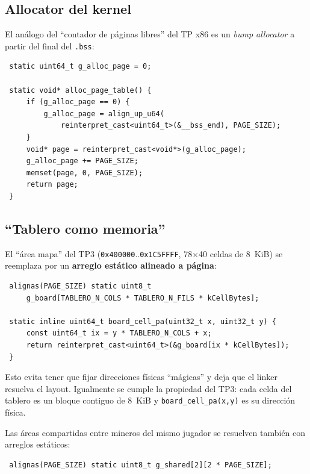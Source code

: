 \subsection{Allocator del kernel}

El análogo del ``contador de páginas libres'' del TP x86 es un \emph{bump allocator} a partir del final del
\texttt{.bss}:

\begin{codesnippet}
\begin{verbatim}
 static uint64_t g_alloc_page = 0;

 static void* alloc_page_table() {
     if (g_alloc_page == 0) {
         g_alloc_page = align_up_u64(
             reinterpret_cast<uint64_t>(&__bss_end), PAGE_SIZE);
     }
     void* page = reinterpret_cast<void*>(g_alloc_page);
     g_alloc_page += PAGE_SIZE;
     memset(page, 0, PAGE_SIZE);
     return page;
 }
\end{verbatim}
\end{codesnippet}

\subsection{``Tablero como memoria''}

El ``área mapa'' del TP3 (\texttt{0x400000}..\texttt{0x1C5FFFF}, 78$\times$40 celdas de 8~KiB) se reemplaza por un
\textbf{arreglo estático alineado a página}:

\begin{codesnippet}
\begin{verbatim}
 alignas(PAGE_SIZE) static uint8_t
     g_board[TABLERO_N_COLS * TABLERO_N_FILS * kCellBytes];

 static inline uint64_t board_cell_pa(uint32_t x, uint32_t y) {
     const uint64_t ix = y * TABLERO_N_COLS + x;
     return reinterpret_cast<uint64_t>(&g_board[ix * kCellBytes]);
 }
\end{verbatim}
\end{codesnippet}

Esto evita tener que fijar direcciones físicas ``mágicas'' y deja que el linker resuelva el layout. Igualmente se cumple
la propiedad del TP3: cada celda del tablero es un bloque contiguo de 8~KiB y \texttt{board\_cell\_pa(x,y)} es su
dirección física.

Las áreas compartidas entre mineros del mismo jugador se resuelven también con arreglos estáticos:

\begin{codesnippet}
\begin{verbatim}
 alignas(PAGE_SIZE) static uint8_t g_shared[2][2 * PAGE_SIZE];
\end{verbatim}
\end{codesnippet}

